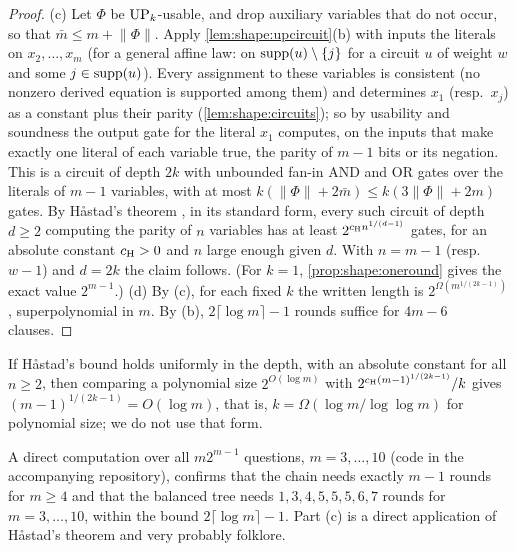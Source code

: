 \begin{proof}
(c) Let $\Phi$ be $\mathrm{UP}_k$-usable, and drop auxiliary variables that do not occur, so that $\bar m\le m+\lVert\Phi\rVert$. Apply \cref{lem:shape:upcircuit}(b) with inputs the literals on $x_2,\dots,x_m$ (for a general affine law: on $\operatorname{supp}(u)\setminus\{j\}$ for a circuit $u$ of weight $w$ and some $j\in\operatorname{supp}(u)$). Every assignment to these variables is consistent (no nonzero derived equation is supported among them) and determines $x_1$ (resp.\ $x_j$) as a constant plus their parity (\cref{lem:shape:circuits}); so by usability and soundness the output gate for the literal $x_1$ computes, on the inputs that make exactly one literal of each variable true, the parity of $m-1$ bits or its negation. This is a circuit of depth $2k$ with unbounded fan-in AND and OR gates over the literals of $m-1$ variables, with at most $k(\lVert\Phi\rVert+2\bar m)\le k(3\lVert\Phi\rVert+2m)$ gates. By H{\aa}stad's theorem \citep{hastad1986almost}, in its standard form, every such circuit of depth $d\ge2$ computing the parity of $n$ variables has at least $2^{c_{\rm H}n^{1/(d-1)}}$ gates, for an absolute constant $c_{\rm H}>0$ and $n$ large enough given $d$. With $n=m-1$ (resp.\ $w-1$) and $d=2k$ the claim follows. (For $k=1$, \cref{prop:shape:oneround} gives the exact value $2^{m-1}$.)
(d) By (c), for each fixed $k$ the written length is $2^{\Omega(m^{1/(2k-1)})}$, superpolynomial in $m$. By (b), $2\lceil\log m\rceil-1$ rounds suffice for $4m-6$ clauses.
\end{proof}

If H{\aa}stad's bound holds uniformly in the depth, with an absolute constant for all $n\ge2$, then comparing a polynomial size $2^{O(\log m)}$ with $2^{c_{\rm H}(m-1)^{1/(2k-1)}}/k$ gives $(m-1)^{1/(2k-1)}=O(\log m)$, that is, $k=\Omega(\log m/\log\log m)$ for polynomial size; we do not use that form.

A direct computation over all $m2^{m-1}$ questions, $m=3,\dots,10$ (code in the accompanying repository), confirms that the chain needs exactly $m-1$ rounds for $m\ge4$ and that the balanced tree needs $1,3,4,5,5,5,6,7$ rounds for $m=3,\dots,10$, within the bound $2\lceil\log m\rceil-1$. Part (c) is a direct application of H{\aa}stad's theorem and very probably folklore.

